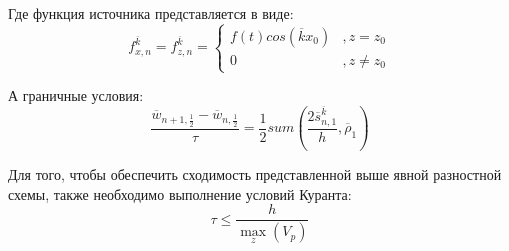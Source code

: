 Где функция источника представляется в виде:
$$
f_{x,n}^{\overline k}=f_{z,n}^{\overline k}=\left\{
  \begin{array}{ccc}
    f(t)cos(\overline k x_0) & , z=z_0 \\
    0 & , z\neq z_0
  \end{array}
\right.
$$

А граничные условия:
$$
\frac{\overline w_{n+1, \frac{1}{2}} - \overline w_{n, \frac{1}{2}}}{\tau}
= \frac{1}{2} sum(\frac{2\overline s_{n,1}^{\overline k}}{h}, \overline\rho_1)
$$

Для того, чтобы обеспечить сходимость представленной выше явной разностной схемы, также необходимо выполнение условий Куранта:
\begin{equation}
\label{eq:10}
\tau \leq \frac{h}{\max\limits_z\left({V_p}\right)}
\end{equation}

\clearpage
